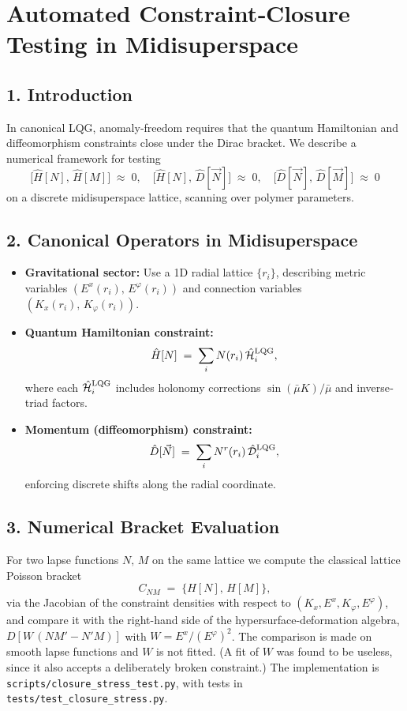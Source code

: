 \documentclass[12pt]{article}
\begin{document}
\section*{Automated Constraint‐Closure Testing in Midisuperspace}

\subsection*{1. Introduction}
In canonical LQG, anomaly‐freedom requires that the quantum Hamiltonian and diffeomorphism constraints close under the Dirac bracket.  We describe a numerical framework for testing 
\[
  \bigl[\hat{H}[N],\,\hat{H}[M]\bigr]\;\approx\;0, 
  \quad 
  \bigl[\hat{H}[N],\,\hat{D}[\vec{N}]\bigr]\;\approx\;0,
  \quad 
  \bigl[\hat{D}[\vec{N}],\,\hat{D}[\vec{M}]\bigr]\;\approx\;0
\]
on a discrete midisuperspace lattice, scanning over polymer parameters.

\subsection*{2. Canonical Operators in Midisuperspace}
\begin{itemize}
  \item \textbf{Gravitational sector:} Use a 1D radial lattice $\{r_i\}$, describing metric variables $(E^x(r_i),\,E^\varphi(r_i))$ and connection variables $(K_x(r_i),\,K_\varphi(r_i))$.  
  \item \textbf{Quantum Hamiltonian constraint:} 
    \[
      \hat{H}[N] \;=\; \sum_{i}N(r_i)\,\hat{\mathcal{H}}_i^{\rm LQG},
    \]
    where each $\hat{\mathcal{H}}_i^{\rm LQG}$ includes holonomy corrections $\sin(\bar\mu K)/\bar\mu$ and inverse‐triad factors.  
  \item \textbf{Momentum (diffeomorphism) constraint:} 
    \[
      \hat{D}[\vec{N}] \;=\; \sum_{i}N^r(r_i)\,\hat{\mathcal{D}}_i^{\rm LQG},
    \]
    enforcing discrete shifts along the radial coordinate.
\end{itemize}

\subsection*{3. Numerical Bracket Evaluation}
For two lapse functions $N,\,M$ on the same lattice we compute the classical lattice Poisson bracket
\[
  C_{NM} \;=\; \{H[N],\,H[M]\},
\]
via the Jacobian of the constraint densities with respect to $(K_x,E^x,K_\varphi,E^\varphi)$, and compare it with the right-hand side of the hypersurface-deformation algebra, $D\!\left[W\,(NM'-N'M)\right]$ with $W=E^x/(E^\varphi)^2$.  The comparison is made on smooth lapse functions and $W$ is not fitted.  (A fit of $W$ was found to be useless, since it also accepts a deliberately broken constraint.)  The implementation is \texttt{scripts/closure\_stress\_test.py}, with tests in \texttt{tests/test\_closure\_stress.py}.
\end{document}
